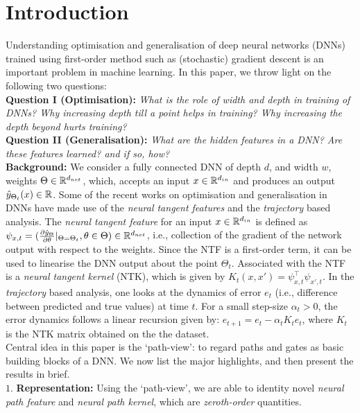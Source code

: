 \section{Introduction}
Understanding optimisation and generalisation of deep neural networks (DNNs) trained using first-order method such as (stochastic) gradient descent is an important problem in machine learning. In this paper, we throw light on the following two questions:\hfill\\
\textbf{Question I (Optimisation):} \emph{What is the role of width and depth in training of DNNs? Why increasing depth till a point helps in training? Why increasing the depth beyond hurts training?}\\
\textbf{Question II (Generalisation):} \emph{What are the hidden features in a DNN? Are these features learned? and if so, how?} \hfill\\
\textbf {Background:} We consider a fully connected DNN of depth $d$, and width $w$, weights $\Theta\in\mathbb{R}^{d_{net}}$, which, accepts an input $x\in \mathbb{R}^{d_{in}}$ and produces an output $\hat{y}_{\Theta_t}(x)\in \mathbb{R}$. Some of the recent works on optimisation and generalisation in DNNs have made use of the \emph{neural tangent features} and the \emph{trajectory} based analysis. The \emph{neural tangent feature} for an input $x\in \mathbb{R}^{d_{in}}$ is defined as $\psi_{x,t}=(\frac{\partial \hat{y}_{\Theta}}{\partial \theta}|_{\Theta=\Theta_t},\theta \in \Theta)\in \mathbb{R}^{d_{net}}$, i.e., collection of the gradient of the network output with respect to the weights. Since the NTF is a first-order term, it can be used to linearise the DNN output about the point $\Theta_t$. Associated with the NTF is a \emph{neural tangent kernel} (NTK), which is given by $K_t(x,x')=\psi^\top_{x,t}\psi_{x',t}$. In the \emph{trajectory} based analysis, one looks at the dynamics of error $e_t$  (i.e., difference between predicted and true values) at time $t$. For a small step-size $\alpha_t>0$, the error dynamics follows a linear recursion given by: $e_{t+1}=e_t-\alpha_tK_te_t$, where $K_t$ is the NTK matrix obtained on the the dataset.\hfill\\
Central idea in this paper is the `path-view': to regard paths and gates as basic building blocks of a DNN. We now list the major highlights, and then present the results in brief.\hfill\\
$1.$ \textbf{Representation:} Using the `path-view', we are able to identity novel \emph{neural path feature} and \emph{neural path kernel}, which are \emph{zeroth-order} quantities. \hfill\\
